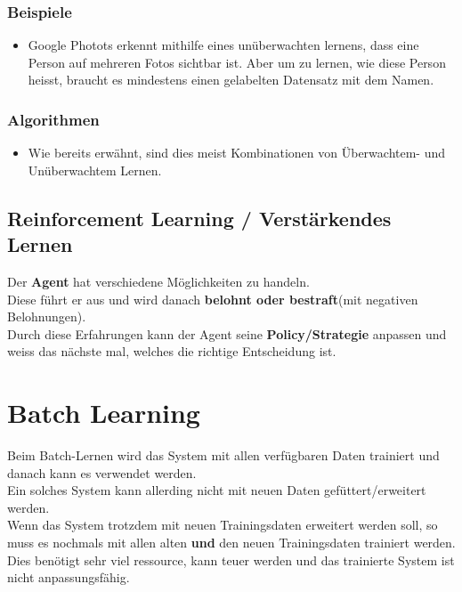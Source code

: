 \documentclass[11pt]{article}
\providecommand{\tightlist}{%
      \setlength{\itemsep}{0pt}\setlength{\parskip}{0pt}}
\begin{document}
\subsubsection{Beispiele}\label{beispiele}

\begin{itemize}
\tightlist
\item
  Google Photots erkennt mithilfe eines unüberwachten lernens, dass eine
  Person auf mehreren Fotos sichtbar ist. Aber um zu lernen, wie diese
  Person heisst, braucht es mindestens einen gelabelten Datensatz mit
  dem Namen.
\end{itemize}

\subsubsection{Algorithmen}\label{algorithmen}

\begin{itemize}
\tightlist
\item
  Wie bereits erwähnt, sind dies meist Kombinationen von Überwachtem-
  und Unüberwachtem Lernen.
\end{itemize}

    \subsection{Reinforcement Learning / Verstärkendes
Lernen}\label{reinforcement-learning-verstuxe4rkendes-lernen}

Der \textbf{Agent} hat verschiedene Möglichkeiten zu handeln.\\
Diese führt er aus und wird danach \textbf{belohnt oder bestraft}(mit
negativen Belohnungen).\\
Durch diese Erfahrungen kann der Agent seine \textbf{Policy/Strategie}
anpassen und weiss das nächste mal, welches die richtige Entscheidung
ist.

    \section{Batch Learning}\label{batch-learning}

Beim Batch-Lernen wird das System mit allen verfügbaren Daten trainiert
und danach kann es verwendet werden.\\
Ein solches System kann allerding nicht mit neuen Daten
gefüttert/erweitert werden.\\
Wenn das System trotzdem mit neuen Trainingsdaten erweitert werden soll,
so muss es nochmals mit allen alten \textbf{und} den neuen
Trainingsdaten trainiert werden.\\
Dies benötigt sehr viel ressource, kann teuer werden und das trainierte
System ist nicht anpassungsfähig.
\end{document}
